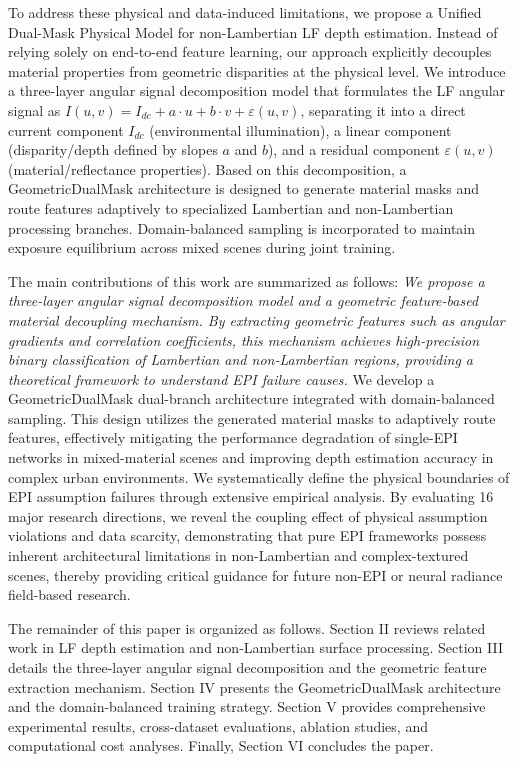 To address these physical and data-induced limitations, we propose a Unified Dual-Mask Physical Model for non-Lambertian LF depth estimation. Instead of relying solely on end-to-end feature learning, our approach explicitly decouples material properties from geometric disparities at the physical level. We introduce a three-layer angular signal decomposition model that formulates the LF angular signal as $I(u,v) = I_{dc} + a \cdot u + b \cdot v + \varepsilon(u,v)$, separating it into a direct current component $I_{dc}$ (environmental illumination), a linear component (disparity/depth defined by slopes $a$ and $b$), and a residual component $\varepsilon(u,v)$ (material/reflectance properties). Based on this decomposition, a GeometricDualMask architecture is designed to generate material masks and route features adaptively to specialized Lambertian and non-Lambertian processing branches. Domain-balanced sampling is incorporated to maintain exposure equilibrium across mixed scenes during joint training.

The main contributions of this work are summarized as follows:
\textit{ We propose a three-layer angular signal decomposition model and a geometric feature-based material decoupling mechanism. By extracting geometric features such as angular gradients and correlation coefficients, this mechanism achieves high-precision binary classification of Lambertian and non-Lambertian regions, providing a theoretical framework to understand EPI failure causes.
} We develop a GeometricDualMask dual-branch architecture integrated with domain-balanced sampling. This design utilizes the generated material masks to adaptively route features, effectively mitigating the performance degradation of single-EPI networks in mixed-material scenes and improving depth estimation accuracy in complex urban environments.
We systematically define the physical boundaries of EPI assumption failures through extensive empirical analysis. By evaluating 16 major research directions, we reveal the coupling effect of physical assumption violations and data scarcity, demonstrating that pure EPI frameworks possess inherent architectural limitations in non-Lambertian and complex-textured scenes, thereby providing critical guidance for future non-EPI or neural radiance field-based research.

The remainder of this paper is organized as follows. Section II reviews related work in LF depth estimation and non-Lambertian surface processing. Section III details the three-layer angular signal decomposition and the geometric feature extraction mechanism. Section IV presents the GeometricDualMask architecture and the domain-balanced training strategy. Section V provides comprehensive experimental results, cross-dataset evaluations, ablation studies, and computational cost analyses. Finally, Section VI concludes the paper.

